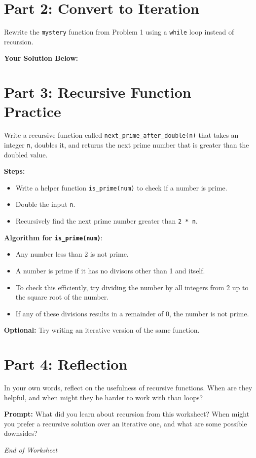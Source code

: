 \documentclass[12pt]{article}
\begin{document}
\section*{Part 2: Convert to Iteration}

Rewrite the \texttt{mystery} function from Problem 1 using a \texttt{while} loop instead of recursion.

\textbf{Your Solution Below:}

\vspace{8em}

\section*{Part 3: Recursive Function Practice}

Write a recursive function called \texttt{next\_prime\_after\_double(n)} that takes an integer \texttt{n}, doubles it, and returns the next prime number that is greater than the doubled value.

\textbf{Steps:}
\begin{itemize}
    \item Write a helper function \texttt{is\_prime(num)} to check if a number is prime.
    \item Double the input \texttt{n}.
    \item Recursively find the next prime number greater than \texttt{2 * n}.
\end{itemize}

\vspace{1em}

\textbf{Algorithm for \texttt{is\_prime(num)}}:
\begin{itemize}
    \item Any number less than 2 is not prime.
    \item A number is prime if it has no divisors other than 1 and itself.
    \item To check this efficiently, try dividing the number by all integers from 2 up to the square root of the number.
    \item If any of these divisions results in a remainder of 0, the number is not prime.
\end{itemize}

\vspace{10em}

\textbf{Optional:} Try writing an iterative version of the same function.

\vspace{4em}

\section*{Part 4: Reflection}

In your own words, reflect on the usefulness of recursive functions. When are they helpful, and when might they be harder to work with than loops?

\textbf{Prompt:} What did you learn about recursion from this worksheet? When might you prefer a recursive solution over an iterative one, and what are some possible downsides?

\vspace{10em}

\textit{End of Worksheet}
\end{document}
